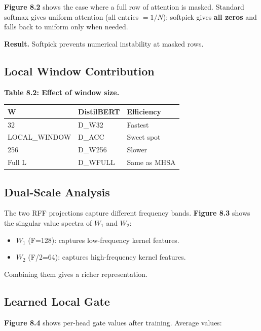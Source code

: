 \textbf{Figure 8.2} shows the case where a full row of attention is masked. 
Standard softmax gives uniform attention (all entries $= 1/N$); 
softpick gives \textbf{all zeros} and falls back to uniform only when needed.

\textbf{Result.} Softpick prevents numerical instability at masked rows.

\subsection{Local Window Contribution}

\textbf{Table 8.2: Effect of window size.}

\begin{table}[H]
\centering
\small
\begin{tabular}{lll}
\toprule
\textbf{W} & \textbf{DistilBERT} & \textbf{Efficiency} \\
\midrule
32 & {{D\_W32}} & Fastest \\
{{LOCAL\_WINDOW}} & {{D\_ACC}} & Sweet spot \\
256 & {{D\_W256}} & Slower \\
Full L & {{D\_WFULL}} & Same as MHSA \\
\bottomrule
\end{tabular}
\end{table}

\subsection{Dual-Scale Analysis}

The two RFF projections capture different frequency bands. \textbf{Figure 8.3} 
shows the singular value spectra of $W_1$ and $W_2$:

\begin{itemize}
\item $W_1$ (F=128): captures low-frequency kernel features.
\item $W_2$ (F/2=64): captures high-frequency kernel features.

\end{itemize}
Combining them gives a richer representation.

\subsection{Learned Local Gate}

\textbf{Figure 8.4} shows per-head gate values after training. Average values:

